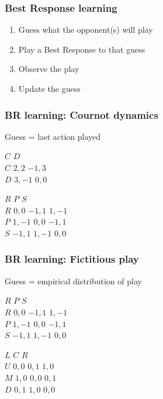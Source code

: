 
\begin{framestruct}
\end{framestruct}

\begin{frame}
  \frametitle{Best Response learning}

  \begin{enumerate}
  \pause \item Guess what the opponent(s) will play
  \pause \item Play a Best Response to that guess
  \pause \item Observe the play
  \pause \item Update the guess
  \end{enumerate}

\end{frame}

\begin{frame}
  \frametitle{BR learning: Cournot dynamics}
  \pause
  Guess = last action played
  \pause

  \begin{game}{2}{2}
      \> $C$     \> $D$    \\
    $C$ \> $2, 2$  \> $-1, 3$\\
    $D$ \> $3, -1$ \> $0, 0$ \\
  \end{game}
  \pause

  \begin{game}{3}{3}
      \> $R$     \> $P$     \> $S$     \\
    $R$ \> $0, 0$  \> $-1, 1$ \> $1, -1$ \\
    $P$ \> $1, -1$ \> $0, 0$  \> $-1, 1$ \\
    $S$ \> $-1, 1$ \> $1, -1$ \> $0, 0$
  \end{game}

\end{frame}

\begin{frame}
  \frametitle{BR learning: Fictitious play}
  \pause
  Guess = empirical distribution of play
  \pause
  \begin{game}{3}{3}
      \> $R$     \> $P$     \> $S$     \\
    $R$ \> $0, 0$  \> $-1, 1$ \> $1, -1$ \\
    $P$ \> $1, -1$ \> $0, 0$  \> $-1, 1$ \\
    $S$ \> $-1, 1$ \> $1, -1$ \> $0, 0$
  \end{game}
  \pause
  \begin{game}{3}{3}
      \> $L$    \> $C$    \> $R$    \\
    $U$ \> $0, 0$ \> $0, 1$ \> $1, 0$ \\
    $M$ \> $1, 0$ \> $0, 0$ \> $0, 1$ \\
    $D$ \> $0, 1$ \> $1, 0$ \> $0, 0$
  \end{game}
\end{frame}

